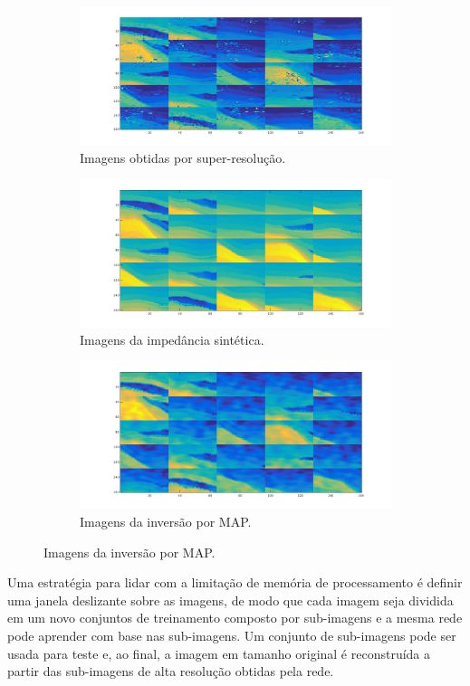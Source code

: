\begin{figure}[ht]
\centering
\begin{subfigure}{.8\textwidth}
  \centering
  \includegraphics[width=.7\linewidth]{fig/inversion_cnn}
  \caption{Imagens obtidas por super-resolução.}
  \label{fig:inversionhr}
\end{subfigure}

\begin{subfigure}{.8\textwidth}
  \centering
  \includegraphics[width=.7\linewidth]{fig/inversion_hr_test}
  \caption{Imagens da impedância sintética.}
  \label{fig:hr}
\end{subfigure}
\begin{subfigure}{.8\textwidth}
  \centering
  \includegraphics[width=.7\linewidth]{fig/inversion_map}
  \caption{Imagens da inversão por MAP.}
  \label{fig:inversionlr}
\end{subfigure}%
\label{fig:inversions}
\end{figure}

Uma estratégia para lidar com a limitação de memória de processamento é definir uma janela deslizante sobre as imagens, de
modo que cada imagem seja dividida em um novo conjuntos de treinamento composto por sub-imagens e a mesma rede pode
aprender com base nas sub-imagens. Um conjunto de sub-imagens pode ser usada para teste e, ao final, a imagem em tamanho
original é reconstruída a partir das sub-imagens de alta resolução obtidas pela rede.

